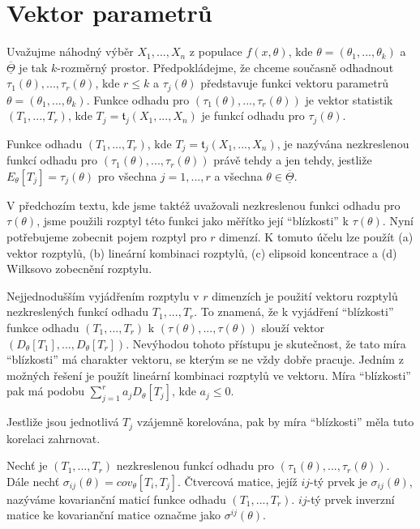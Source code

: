 \section{Vektor parametrů}

Uvažujme náhodný výběr $X_1, ..., X_n$ z populace $f(x, \theta)$, kde $\theta = (\theta_1, ..., \theta_k)$ a $\overline{\underline{\Theta}}$ je tak $k$-rozměrný prostor. Předpokládejme, že chceme současně odhadnout $\tau_1(\theta), ..., \tau_r(\theta)$, kde $r \le k$ a $\tau_j(\theta)$ představuje funkci vektoru parametrů $\theta = (\theta_1, ..., \theta_k)$. Funkce odhadu pro $(\tau_1(\theta), ..., \tau_r(\theta))$ je vektor statistik $(T_1, ..., T_r)$, kde $T_j = \mathfrak{t}_j(X_1, ..., X_n)$ je funkcí odhadu pro $\tau_j(\theta)$.

\begin{definition}
Funkce odhadu $(T_1, ..., T_r)$, kde $T_j = \mathfrak{t}_j(X_1, ..., X_n)$, je nazývána nezkreslenou funkcí odhadu pro $(\tau_1(\theta), ..., \tau_r(\theta))$ právě tehdy a jen tehdy, jestliže $E_{\theta}[T_j] = \tau_j(\theta)$ pro všechna $j = 1, ..., r$ a všechna $\theta \in \overline{\underline{\Theta}}$.
\end{definition}

V předchozím textu, kde jsme taktéž uvažovali nezkreslenou funkci odhadu pro $\tau(\theta)$, jsme použili rozptyl této funkci jako měřítko její ``blízkosti'' k $\tau(\theta)$. Nyní potřebujeme zobecnit pojem rozptyl pro $r$ dimenzí. K tomuto účelu lze použít (a) vektor rozptylů, (b) lineární kombinaci rozptylů, (c) elipsoid koncentrace a (d) Wilksovo zobecnění rozptylu.

Nejjednodušším vyjádřením rozptylu v $r$ dimenzích je použití vektoru rozptylů nezkreslených funkcí odhadu $T_1, ..., T_r$. To znamená, že k vyjádření ``blízkosti'' funkce odhadu $(T_1, ..., T_r)$ k $(\tau(\theta), ..., \tau(\theta))$ slouží vektor $(D_{\theta}[T_1], ..., D_{\theta}[T_r])$. Nevýhodou tohoto přístupu je skutečnost, že tato míra ``blízkosti'' má charakter vektoru, se kterým se ne vždy dobře pracuje. Jedním z možných řešení je použít lineární kombinaci rozptylů ve vektoru. Míra ``blízkosti'' pak má podobu $\sum_{j = 1}^r a_j D_{\theta}[T_j]$, kde $a_j \le 0$.

Jestliže jsou jednotlivá $T_j$ vzájemně korelována, pak by míra ``blízkosti'' měla tuto korelaci zahrnovat.

\begin{definition}
Nechť je $(T_1, ..., T_r)$ nezkreslenou funkcí odhadu pro $(\tau_1(\theta), ..., \tau_r(\theta))$. Dále nechť $\sigma_{ij}(\theta) = cov_{\theta}[T_i, T_j]$. Čtvercová matice, jejíž $ij$-tý prvek je $\sigma_{ij}(\theta)$, nazýváme kovarianční maticí funkce odhadu $(T_1, ..., T_r)$. $ij$-tý prvek inverzní matice ke kovarianční matice označme jako $\sigma^{ij}(\theta)$.
\end{definition}

